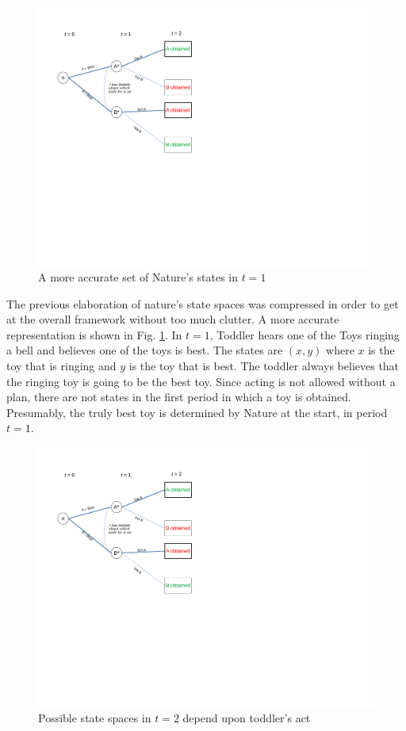 \documentclass[
11pt,
titlepage,
reqno,
]{article}%
\theoremstyle{definition}
\begin{document}
\begin{figure}[h!]
	\centering
	\includegraphics*[page=15,trim = 0in 7in 6in 0in,scale=1]{Awareness_Diagrams_All}
	\caption{A more accurate set of Nature's states in $t=1$\label{Diag: p-15}}%
\end{figure}

The previous elaboration of nature's state spaces was compressed in order to get at the overall framework without too much clutter. A more accurate representation is shown in Fig. \ref{Diag: p-15}. In $t=1$, Toddler hears one of the Toys ringing a bell and believes one of the toys is best. The states are $(x,y)$ where $x$ is the toy that is ringing and $y$ is the toy that is best. The toddler always believes that the ringing toy is going to be the best toy. Since acting is not allowed without a plan, there are not states in the first period in which a toy is obtained. Presumably, the truly best toy is determined by Nature at the start, in period $t=1$.

\begin{figure}[h!]
	\centering
	\includegraphics*[page=16,trim = 0in 5in 1in 0in,scale=.65]{Awareness_Diagrams_All}
	\caption{Possible state spaces in $t=2$ depend upon toddler's act\label{Diag: p-16}}%
\end{figure}
\end{document}
